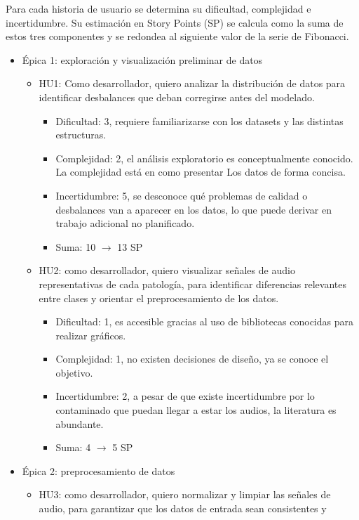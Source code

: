 \documentclass[
11pt, %
]{charter}
\begin{document}
Para cada historia de usuario se determina su dificultad, complejidad e incertidumbre.
Su estimación en Story Points (SP) se calcula como la suma de estos tres componentes y se redondea al siguiente valor de la serie de Fibonacci.
\begin{itemize}
  \item Épica 1: exploración y visualización preliminar de datos
    \begin{itemize}
      \item HU1: Como desarrollador, quiero analizar la distribución de datos para identificar desbalances 
      que deban corregirse antes del modelado.
      \begin{itemize}
        \item Dificultad: 3, requiere familiarizarse con los datasets y las distintas estructuras.
        \item Complejidad: 2, el análisis exploratorio es conceptualmente conocido. La complejidad está en como presentar Los
        datos de forma concisa.
        \item Incertidumbre: 5, se desconoce qué problemas de calidad o desbalances van a aparecer en los datos, 
        lo que puede derivar en trabajo adicional no planificado.
        \item Suma: 10 $\rightarrow$ 13 SP
      \end{itemize}
      \item HU2: como desarrollador, quiero visualizar señales de audio representativas de cada patología, para identificar 
      diferencias relevantes entre clases y orientar el preprocesamiento de los datos.
      \begin{itemize}
        \item Dificultad: 1, es accesible gracias al uso de bibliotecas conocidas para realizar gráficos.
        \item Complejidad: 1, no existen decisiones de diseño, ya se conoce el objetivo.
        \item Incertidumbre: 2, a pesar de que existe incertidumbre por lo contaminado que puedan llegar a estar los audios, la literatura es
        abundante.
        \item Suma: 4 $\rightarrow$ 5 SP
      \end{itemize}
    \end{itemize}
  \item Épica 2: preprocesamiento de datos
    \begin{itemize}
      \item HU3: como desarrollador, quiero normalizar y limpiar las señales de audio, para garantizar que los datos de entrada sean consistentes y 

\end{itemize}
\end{itemize}
\end{document}
